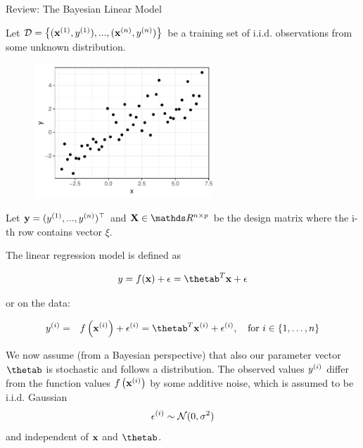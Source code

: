










\begin{vbframe}{Review: The Bayesian Linear Model}

Let $\D = \left\{(\xi[1], \yi[1]), ..., (\xi[n], \yi[n])\right\}$ be a training set of i.i.d. observations from some unknown distribution.

\begin{figure}
  \includegraphics[width=0.6\textwidth]{figure_man/bayes-lm/example.pdf}
\end{figure}

Let $\yv = (\yi[1], ..., \yi[n])^\top$ and $\Xmat \in \R^{n \times p}$ be the design matrix where the i-th row contains vector $\xi$.  

\framebreak

The linear regression model is defined as

$$
y = \fx + \epsilon = \thetab^T \xv + \epsilon 
$$

or on the data:

\begin{eqnarray*}
\yi &=& \fxi + \epsi = \thetab^T \xi + \epsi, \quad \text{for } i \in \{1, \ldots, n\}
\end{eqnarray*}


We now assume (from a Bayesian perspective) that also our parameter vector $\thetab$ is stochastic and follows a distribution.
The observed values $\yi$ differ from the function values $\fxi$ by some additive noise, which is assumed to be i.i.d. Gaussian 
$$
\epsi \sim \mathcal{N}(0, \sigma^2)$$
and independent of $\xv$ and $\thetab$.


\end{vbframe}
